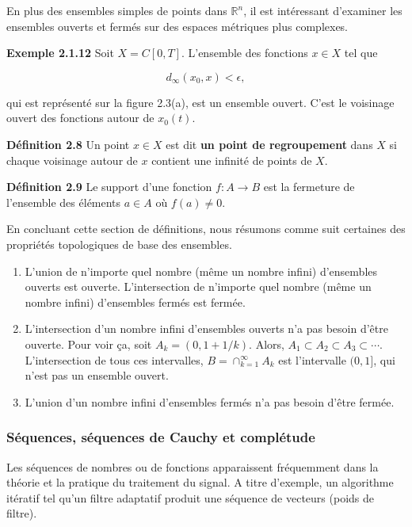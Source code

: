 \documentclass[11pt,twoside,a4paper]{article}
\begin{document}
En plus des ensembles simples de points dans $\mathbb{R}^n$, il est intéressant d'examiner les ensembles ouverts et fermés sur des espaces métriques plus complexes.

\textbf{Exemple 2.1.12} Soit $X = C[0, T]$. L'ensemble des fonctions $x \in X$ tel que

\begin{equation*}
  d_\infty(x_0, x) < \epsilon,
\end{equation*}

qui est représenté sur la figure 2.3(a), est un ensemble ouvert. C'est le voisinage ouvert des fonctions autour de $x_0(t)$.

\textbf{Définition 2.8} Un point $x \in X$ est dit \textbf{un point de regroupement} dans $X$ si chaque voisinage autour de $x$ contient une infinité de points de $X$.

\textbf{Définition 2.9} Le support d'une fonction $f:A \longrightarrow B$ est la fermeture de l'ensemble des éléments $a \in A$ où $f(a) \neq 0$.

En concluant cette section de définitions, nous résumons comme suit certaines des propriétés topologiques de base des ensembles.

\begin{enumerate}
  \item L'union de n'importe quel nombre (même un nombre infini) d'ensembles ouverts est ouverte. L'intersection de n'importe quel nombre (même un nombre infini) d'ensembles fermés est fermée.
  \item L'intersection d'un nombre infini d'ensembles ouverts n'a pas besoin d'être ouverte. Pour voir ça, soit $A_k = (0, 1 + 1/k)$. Alors, $A_1 \subset A_2 \subset A_3 \subset \cdots$.
  L'intersection de tous ces intervalles, $B = \cap_{k=1}^{\infty} A_k$ est l'intervalle $(0, 1]$, qui n'est pas un ensemble ouvert.
  \item L'union d'un nombre infini d'ensembles fermés n'a pas besoin d'être fermée.
\end{enumerate}

\subsubsection{Séquences, séquences de Cauchy et complétude}
Les séquences de nombres ou de fonctions apparaissent fréquemment dans la théorie et la pratique du traitement du signal. A titre d'exemple, un algorithme itératif tel qu'un filtre adaptatif produit une séquence de vecteurs (poids de filtre).
\end{document}
